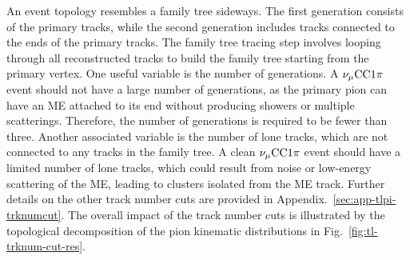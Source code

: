           An event topology resembles a family tree sideways. 
          The first generation consists of the primary tracks, while the second generation includes tracks connected to the ends of the primary tracks. 
          The family tree tracing step involves looping through all reconstructed tracks to build the family tree starting from the primary vertex. 
          One useful variable is the number of generations. 
          A $\nu_{\mu}\textrm{CC}1\pi$ event should not have a large number of generations, as the primary pion can have an ME attached to its end without producing showers or multiple scatterings. 
          Therefore, the number of generations is required to be fewer than three. 
          Another associated variable is the number of lone tracks, which are not connected to any tracks in the family tree. 
          A clean $\nu_{\mu}\textrm{CC}1\pi$ event should have a limited number of lone tracks, which could result from noise or low-energy scattering of the ME, leading to clusters isolated from the ME track. 
          Further details on the other track number cuts are provided in Appendix.~\ref{sec:app-tlpi-trknumcut}. 
          The overall impact of the track number cuts is illustrated by the topological decomposition of the pion kinematic distributions in Fig.~\ref{fig:tl-trknum-cut-res}.

